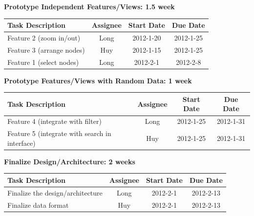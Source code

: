 \documentclass[12pt, letterpaper]{article}
\begin{document}
\begin{center}
		{\bf Prototype Independent Features/Views: 1.5 week}
    \begin{tabular}{| p{8.3cm} || c | c | c | }
      \hline
      Task Description & Assignee & Start Date & Due Date \\
      \hline
	    Feature 2 (zoom in/out)  & Long & 2012-1-20 & 2012-1-25 \\
	    Feature 3 (arrange nodes)  & Huy & 2012-1-15 & 2012-1-25 \\
		Feature 1 (select nodes) & Long & 2012-2-1 & 2012-2-8 \\
      \hline
    \end{tabular}
  \end{center}

\begin{center}
		{\bf Prototype Features/Views with Random Data: 1 week}
    \begin{tabular}{| p{8.3cm} || c | c | c | }
      \hline
      Task Description & Assignee & Start Date & Due Date \\
      \hline
	    Feature 4 (integrate with filter)  & Long & 2012-1-25 & 2012-1-31 \\
            Feature 5 (integrate with search in interface) & Huy & 2012-1-25 & 2012-1-31 \\
      \hline
    \end{tabular}
  \end{center}

  \begin{center}
		{\bf Finalize Design/Architecture: 2 weeks}
    \begin{tabular}{|p{8.3cm} || c | c | c | }
      \hline
      Task Description & Assignee & Start Date & Due Date \\
      \hline
	    Finalize the design/architecture & Long & 2012-2-1 & 2012-2-13 \\
	    Finalize data format  & Huy & 2012-2-1 & 2012-2-13 \\
      \hline
    \end{tabular}
  \end{center}
\end{document}
